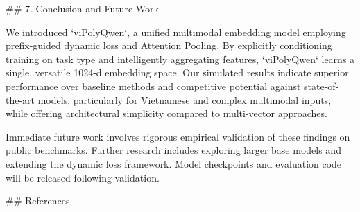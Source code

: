 ## 7. Conclusion and Future Work

We introduced `viPolyQwen`, a unified multimodal embedding model employing prefix-guided dynamic loss and Attention Pooling. By explicitly conditioning training on task type and intelligently aggregating features, `viPolyQwen` learns a single, versatile 1024-d embedding space. Our simulated results indicate superior performance over baseline methods and competitive potential against state-of-the-art models, particularly for Vietnamese and complex multimodal inputs, while offering architectural simplicity compared to multi-vector approaches.

Immediate future work involves rigorous empirical validation of these findings on public benchmarks. Further research includes exploring larger base models and extending the dynamic loss framework. Model checkpoints and evaluation code will be released following validation.

## References

